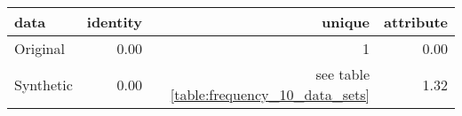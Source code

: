 \begin{tabular}{lrrr}
  \toprule
data & identity & unique & attribute \\ 
  \midrule
Original & 0.00 & 1 & 0.00 \\ 
  Synthetic & 0.00 & see table \ref{table:frequency_10_data_sets} & 1.32 \\ 
   \bottomrule
\end{tabular}
